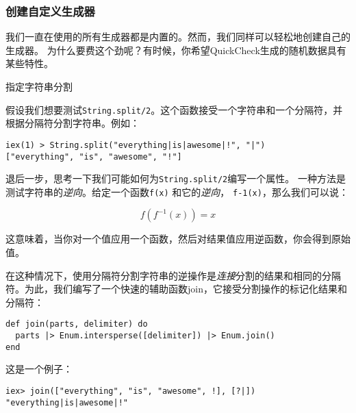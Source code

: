 \subsubsection{创建自定义生成器}

我们一直在使用的所有生成器都是内置的。然而，我们同样可以轻松地创建自己的生成器。
为什么要费这个劲呢？有时候，你希望QuickCheck生成的随机数据具有某些特性。

\begin{example}{指定字符串分割}

假设我们想要测试\texttt{String.split/2}。这个函数接受一个字符串和一个分隔符，并根据分隔符分割字符串。例如：

\begin{code}{}
\begin{verbatim}
iex(1) > String.split("everything|is|awesome|!", "|")
["everything", "is", "awesome", "!"]
\end{verbatim}
\end{code}

退后一步，思考一下我们可能如何为\texttt{String.split/2}编写一个属性。
一种方法是测试字符串的\emph{逆向}。给定一个函数\texttt{f(x)} 和它的\emph{逆向}，
\texttt{f-1(x)}，那么我们可以说：

\begin{equation}\label{eq:11_F1}
	f(f^{-1}(x)) = x
\end{equation}

这意味着，当你对一个值应用一个函数，然后对结果值应用逆函数，你会得到原始值。

在这种情况下，使用分隔符分割字符串的逆操作是\emph{连接}分割的结果和相同的分隔符。为此，我们编写了一个快速的辅助函数join，它接受分割操作的标记化结果和分隔符：

\begin{code}{}
\begin{verbatim}
def join(parts, delimiter) do
  parts |> Enum.intersperse([delimiter]) |> Enum.join()
end
\end{verbatim}
\end{code}

这是一个例子：

\begin{code}{}
\begin{verbatim}
iex> join(["everything", "is", "awesome", !], [?|])
"everything|is|awesome|!"
\end{verbatim}
\end{code}


\end{example}
